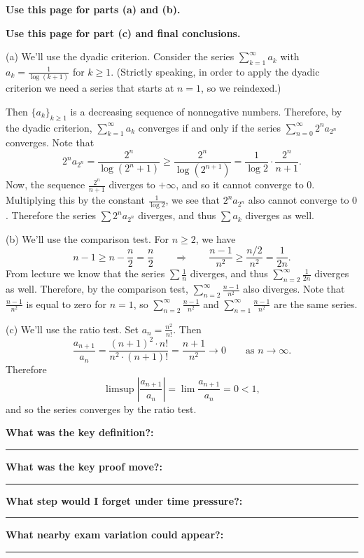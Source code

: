 \documentclass[12pt]{article}
\newcommand{\writespace}[1]{\vspace*{#1}}
\newcommand{\fillfieldbig}[2]{%
  \par\noindent\textbf{#1:}\par
  \writespace{#2}
  \noindent\rule{\linewidth}{0.35pt}\par\vspace{0.15in}%
}
\newcommand{\fullproofpage}[2]{%
  \begin{tcolorbox}[
    enhanced,
    colback=white,
    colframe=gray!60!black,
    fonttitle=\bfseries,
    title={Pass 5 -- Full Proof Attempt\hfill #1},
    height=8.45in
  ]
  \textbf{#2}

  \writespace{7.65in}
  \end{tcolorbox}
}
\newenvironment{solutionbox}[1]{%
  \begin{tcolorbox}[
    enhanced,
    breakable,
    colback=solgreen,
    colframe=green!45!black,
    fonttitle=\bfseries,
    title={#1}
  ]
}{%
  \end{tcolorbox}
}
\newcommand{\reflectionpage}[1]{%
  \begin{tcolorbox}[
    enhanced,
    colback=reflectcyan,
    colframe=cyan!55!black,
    fonttitle=\bfseries,
    title={Reflection \& Variation\hfill #1},
    height=8.45in
  ]
  \fillfieldbig{What was the key definition?}{1.15in}
  \fillfieldbig{What was the key proof move?}{1.15in}
  \fillfieldbig{What step would I forget under time pressure?}{1.15in}
  \fillfieldbig{What nearby exam variation could appear?}{1.35in}
  \end{tcolorbox}
}
\begin{document}
\newpage
\fullproofpage{Homework 7, Problem 1}{Use this page for parts (a) and (b).}

\newpage
\fullproofpage{Homework 7, Problem 1}{Use this page for part (c) and final conclusions.}

\newpage
\begin{solutionbox}{Official Solution (Professor)}
(a) We'll use the dyadic criterion. Consider the series \(\sum_{k=1}^{\infty}a_k\) with \(a_k=\frac1{\log(k+1)}\) for \(k\ge1\). (Strictly speaking, in order to apply the dyadic criterion we need a series that starts at \(n=1\), so we reindexed.)

Then \(\{a_k\}_{k\ge1}\) is a decreasing sequence of nonnegative numbers. Therefore, by the dyadic criterion, \(\sum_{k=1}^{\infty}a_k\) converges if and only if the series \(\sum_{n=0}^{\infty}2^n a_{2^n}\) converges. Note that
\[
  2^n a_{2^n}
  =
  \frac{2^n}{\log(2^n+1)}
  \ge
  \frac{2^n}{\log(2^{n+1})}
  =
  \frac1{\log2}\cdot\frac{2^n}{n+1}.
\]
Now, the sequence \(\frac{2^n}{n+1}\) diverges to \(+\infty\), and so it cannot converge to \(0\). Multiplying this by the constant \(\frac1{\log2}\), we see that \(2^n a_{2^n}\) also cannot converge to \(0\). Therefore the series \(\sum 2^n a_{2^n}\) diverges, and thus \(\sum a_k\) diverges as well.

(b) We'll use the comparison test. For \(n\ge2\), we have
\[
  n-1\ge n-\frac n2=\frac n2
  \qquad \Longrightarrow \qquad
  \frac{n-1}{n^2}\ge \frac{n/2}{n^2}=\frac1{2n}.
\]
From lecture we know that the series \(\sum \frac1n\) diverges, and thus \(\sum_{n=2}^{\infty}\frac1{2n}\) diverges as well. Therefore, by the comparison test, \(\sum_{n=2}^{\infty}\frac{n-1}{n^2}\) also diverges. Note that \(\frac{n-1}{n^2}\) is equal to zero for \(n=1\), so \(\sum_{n=2}^{\infty}\frac{n-1}{n^2}\) and \(\sum_{n=1}^{\infty}\frac{n-1}{n^2}\) are the same series.

(c) We'll use the ratio test. Set \(a_n=\frac{n^2}{n!}\). Then
\[
  \frac{a_{n+1}}{a_n}
  =
  \frac{(n+1)^2\cdot n!}{n^2\cdot (n+1)!}
  =
  \frac{n+1}{n^2}
  \longrightarrow 0
  \qquad \text{as } n\to\infty.
\]
Therefore
\[
  \limsup\left|\frac{a_{n+1}}{a_n}\right|
  =
  \lim\frac{a_{n+1}}{a_n}
  =
  0<1,
\]
and so the series converges by the ratio test.
\end{solutionbox}

\newpage
\reflectionpage{Homework 7, Problem 1}

\newpage
\end{document}
